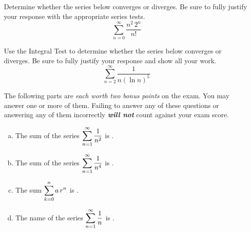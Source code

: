 \documentclass[12pt,letterpaper]{exam}
\begin{document}
\begin{questions}
\newpage
\question[10] Determine whether the series below converges or diverges. Be sure to fully justify your response with the appropriate series tests.
	\[
	\sum_{n=0}^\infty \dfrac{n^2 \, 2^n}{n!}
	\]



\newpage
\question[15] Use the Integral Test to determine whether the series below converges or diverges. Be sure to fully justify your response and show all your work. 
	\[
	\sum_{n=2}^\infty \dfrac{1}{n (\ln n)^5}
	\]



\newpage
{} The following parts are \textit{each worth two bonus points} on the exam. You may answer one or more of them. Failing to answer any of these questions or answering any of them incorrectly \textit{\bfseries will not} count against your exam score. \par\vspace{0.5cm}
	\begin{enumerate}[(a)]
	\item The sum of the series $\displaystyle\sum_{n=1}^\infty \dfrac{1}{n^2}$ is \underline{\hspace{2cm}  \hspace{2cm}}. \par\vspace{0.1cm}
	
	\item The sum of the series $\displaystyle\sum_{n=1}^\infty \dfrac{1}{n^4}$ is \underline{\hspace{2cm}  \hspace{2cm}}. \par\vspace{0.1cm}
	
	\item The sum $\displaystyle\sum_{k=0}^n a\, r^n$ is \underline{\hspace{2cm}  \hspace{2cm}}. \par\vspace{0.1cm}
	
	\item The name of the series $\displaystyle\sum_{n=1}^\infty \dfrac{1}{n}$ is \underline{\hspace{2cm} \phantom{\itshape the Harmonic Series} \hspace{2cm}}. \par\vspace{0.1cm}
	

\end{enumerate}
\end{questions}
\end{document}
